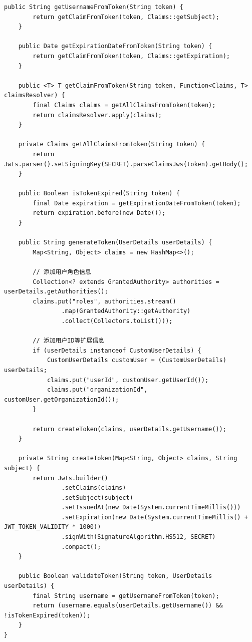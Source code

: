 \begin{lstlisting}[style=java]
    public String getUsernameFromToken(String token) {
        return getClaimFromToken(token, Claims::getSubject);
    }
    
    public Date getExpirationDateFromToken(String token) {
        return getClaimFromToken(token, Claims::getExpiration);
    }
    
    public <T> T getClaimFromToken(String token, Function<Claims, T> claimsResolver) {
        final Claims claims = getAllClaimsFromToken(token);
        return claimsResolver.apply(claims);
    }
    
    private Claims getAllClaimsFromToken(String token) {
        return Jwts.parser().setSigningKey(SECRET).parseClaimsJws(token).getBody();
    }
    
    public Boolean isTokenExpired(String token) {
        final Date expiration = getExpirationDateFromToken(token);
        return expiration.before(new Date());
    }
    
    public String generateToken(UserDetails userDetails) {
        Map<String, Object> claims = new HashMap<>();
        
        // 添加用户角色信息
        Collection<? extends GrantedAuthority> authorities = userDetails.getAuthorities();
        claims.put("roles", authorities.stream()
                .map(GrantedAuthority::getAuthority)
                .collect(Collectors.toList()));
                
        // 添加用户ID等扩展信息
        if (userDetails instanceof CustomUserDetails) {
            CustomUserDetails customUser = (CustomUserDetails) userDetails;
            claims.put("userId", customUser.getUserId());
            claims.put("organizationId", customUser.getOrganizationId());
        }
        
        return createToken(claims, userDetails.getUsername());
    }
    
    private String createToken(Map<String, Object> claims, String subject) {
        return Jwts.builder()
                .setClaims(claims)
                .setSubject(subject)
                .setIssuedAt(new Date(System.currentTimeMillis()))
                .setExpiration(new Date(System.currentTimeMillis() + JWT_TOKEN_VALIDITY * 1000))
                .signWith(SignatureAlgorithm.HS512, SECRET)
                .compact();
    }
    
    public Boolean validateToken(String token, UserDetails userDetails) {
        final String username = getUsernameFromToken(token);
        return (username.equals(userDetails.getUsername()) && !isTokenExpired(token));
    }
}


\end{lstlisting}
